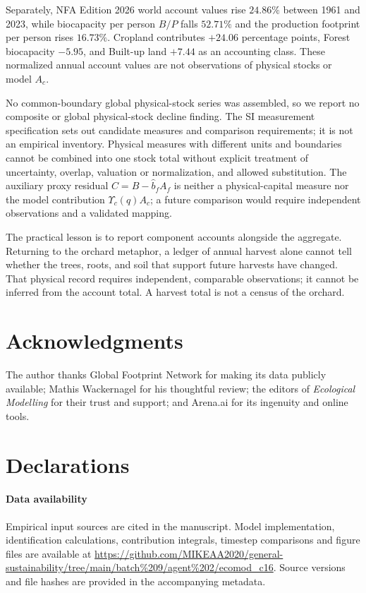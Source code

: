\documentclass[preprint,12pt,authoryear]{elsarticle}
\newcommand{\Ups}{\Upsilon_c}
\begin{document}
Separately, NFA Edition 2026 world account values rise $24.86\%$ between 1961 and 2023, while biocapacity per person $B/P$ falls $52.71\%$ and the production footprint per person rises $16.73\%$. Cropland contributes $+24.06$ percentage points, Forest biocapacity $-5.95$, and Built-up land $+7.44$ as an accounting class. These normalized annual account values are not observations of physical stocks or model $A_c$.

\begin{samepage}
No common-boundary global physical-stock series was assembled, so we report no composite or global physical-stock decline finding. The SI measurement specification sets out candidate measures and comparison requirements; it is not an empirical inventory. Physical measures with different units and boundaries cannot be combined into one stock total without explicit treatment of uncertainty, overlap, valuation or normalization, and allowed substitution. The auxiliary proxy residual $C=B-\hat b_fA_f$ is neither a physical-capital measure nor the model contribution $\Ups(q)A_c$; a future comparison would require independent observations and a validated mapping.\par
\end{samepage}

The practical lesson is to report component accounts alongside the aggregate. Returning to the orchard metaphor, a ledger of annual harvest alone cannot tell whether the trees, roots, and soil that support future harvests have changed. That physical record requires independent, comparable observations; it cannot be inferred from the account total. A harvest total is not a census of the orchard.

\section*{Acknowledgments}

The author thanks Global Footprint Network for making its data publicly available; Mathis Wackernagel for his thoughtful review; the editors of \emph{Ecological Modelling} for their trust and support; and Arena.ai for its ingenuity and online tools.

\section*{Declarations}

\paragraph{Data availability} Empirical input sources are cited in the manuscript. Model implementation, identification calculations, contribution integrals, timestep comparisons and figure files are available at \url{https://github.com/MIKEAA2020/general-sustainability/tree/main/batch%209/agent%202/ecomod_c16}. Source versions and file hashes are provided in the accompanying metadata.
\end{document}
